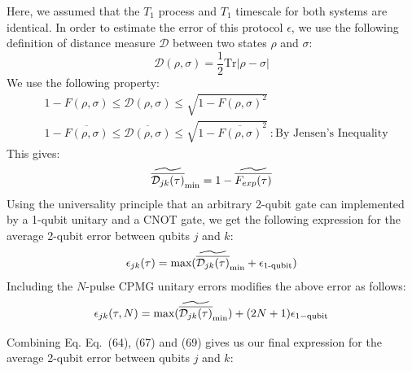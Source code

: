 Here, we assumed that the $T_{1}$ process and $T_{1}$ timescale for both systems are identical. In order to estimate the error of this protocol $\epsilon$, we use the following definition of distance measure $\mathcal{D}$ between two states $\rho$ and $\sigma$:
\begin{equation}
    \mathcal{D}(\rho,\sigma) = \frac{1}{2}\text{Tr}|\rho-\sigma|
\end{equation}
We use the following property:
\begin{subequations}
\begin{align}
    &1 - F(\rho,\sigma) \le \mathcal{D}(\rho,\sigma) \le \sqrt{1 - F(\rho,\sigma)^2}\\
    &1 - \overline{F(\rho,\sigma)} \le \overline{\mathcal{D}(\rho,\sigma)} \le \sqrt{1 - \overline{F(\rho,\sigma)
    }^2}~: \text{By Jensen's Inequality}
\end{align}
\end{subequations}
This gives:
\begin{equation}
    \widetilde{\overline{\mathcal{D}_{jk}(\tau)}}_{\text{min}} = 1 - \widetilde{\overline{{F}_{exp}(\tau)}}
\end{equation}
Using the universality principle that an arbitrary 2-qubit gate can implemented by a 1-qubit unitary and a CNOT gate, we get the following expression for the average 2-qubit error between qubits $j$ and $k$:
\begin{equation}
    \epsilon_{jk}(\tau) = \text{max}(\widetilde{\overline{\mathcal{D}_{jk}(\tau)}}_{\text{min}} + \epsilon_{\text{1-qubit}})
\end{equation}
Including the $N$-pulse CPMG unitary errors modifies the above error as follows:
\begin{equation}
   \epsilon_{jk}(\tau,N) = \text{max}(\widetilde{\overline{\mathcal{D}_{jk}(\tau)}}_{\text{min}}) + (2N+1)\epsilon_{1-\text{qubit}} 
\end{equation}

Combining Eq. Eq.~(64), (67) and (69) gives us our final expression for the average 2-qubit error between qubits $j$ and $k$:

